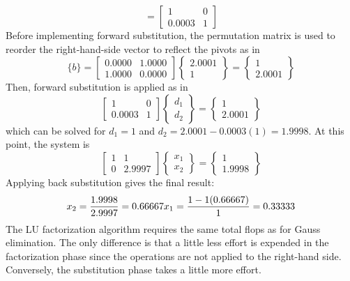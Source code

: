 \documentclass[../main.tex]{subfiles}
\begin{document}
\begin{equation}
[L]=
\begin{bmatrix}
1 & 0\\ 
0.0003 & 1
\end{bmatrix}
\end{equation}
Before implementing forward substitution, the permutation matrix is used to reorder
the right-hand-side vector to reflect the pivots as in
\begin{equation}
[P]\{b\}=
\begin{bmatrix}
0.0000 & 1.0000\\ 
1.0000 & 0.0000
\end{bmatrix}
\begin{Bmatrix}
2.0001\\ 
1
\end{Bmatrix}
=
\begin{Bmatrix}
1\\
2.0001
\end{Bmatrix}
\end{equation}
Then, forward substitution is applied as in
\begin{equation}
\begin{bmatrix}
1 & 0\\ 
0.0003 & 1
\end{bmatrix}
\begin{Bmatrix}
d_{1}\\ 
d_{2}
\end{Bmatrix}
=
\begin{Bmatrix}
1\\
2.0001
\end{Bmatrix}
\end{equation}
which can be solved for $d_{1} = 1$ and $d_{2} = 2.0001 - 0.0003(1) = 1.9998$. At this point, the system is
\begin{equation}
\begin{bmatrix}
1 & 1\\ 
0 & 2.9997
\end{bmatrix}
\begin{Bmatrix}
x_{1}\\ 
x_{2}
\end{Bmatrix}
=
\begin{Bmatrix}
1\\
1.9998
\end{Bmatrix}
\end{equation}
Applying back substitution gives the final result:
\begin{equation}
x_{2} = \frac{1.9998}{2.9997} = 0.66667\\
x_{1} = \frac{1 - 1(0.66667)}{1} = 0.33333
\end{equation}
The LU factorization algorithm requires the same total flops as for Gauss elimination.
The only difference is that a little less effort is expended in the factorization phase since the operations are not applied to the right-hand side. Conversely, the substitution phase takes a little more effort.
\end{document}

